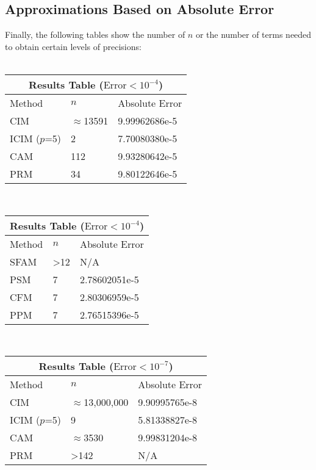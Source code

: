 \documentclass[11pt]{article}
\begin{document}
\subsection{Approximations Based on Absolute Error}
Finally, the following tables show the number of $n$ or the number of terms needed to obtain certain levels of precisions:\\\\
\begin{tabular}{ |p{2cm}|p{2.2cm}|p{2.7cm}| }
\hline
\multicolumn{3}{|c|}{Results Table ($\textrm{Error}<10^{-4}$)} \\
\hline
Method       & $n$            & Absolute Error \\ 
\hline\hline
CIM          & $\approx$13591 & 9.99962686e-5 \\ 
\hline
ICIM ($p$=5) & 2              & 7.70080380e-5 \\
\hline
CAM          & 112            & 9.93280642e-5 \\
\hline
PRM          & 34             & 9.80122646e-5 \\
\hline
\end{tabular}
\,
\begin{tabular}{ |p{1.3cm}|p{2.2cm}|p{2.7cm}|  }
\hline
\multicolumn{3}{|c|}{Results Table ($\textrm{Error}<10^{-4}$)} \\
\hline
Method & $n$ & Absolute Error \\ 
\hline\hline
SFAM   & >12 & N/A \\
\hline
PSM    & 7   & 2.78602051e-5 \\
\hline
CFM    & 7   & 2.80306959e-5 \\
\hline
PPM    & 7   & 2.76515396e-5 \\
\hline
\end{tabular}
\\
\begin{tabular}{ |p{2cm}|p{2.2cm}|p{2.7cm}|  }
\hline
\multicolumn{3}{|c|}{Results Table ($\textrm{Error}<10^{-7}$)} \\
\hline
Method       & $n$                 & Absolute Error \\ 
\hline\hline
CIM          & $\approx$13,000,000 & 9.90995765e-8 \\ 
\hline
ICIM ($p$=5) & 9                   & 5.81338827e-8 \\
\hline
CAM          & $\approx$3530       & 9.99831204e-8 \\
\hline
PRM          & >142                & N/A \\
\hline
\end{tabular}
\end{document}
